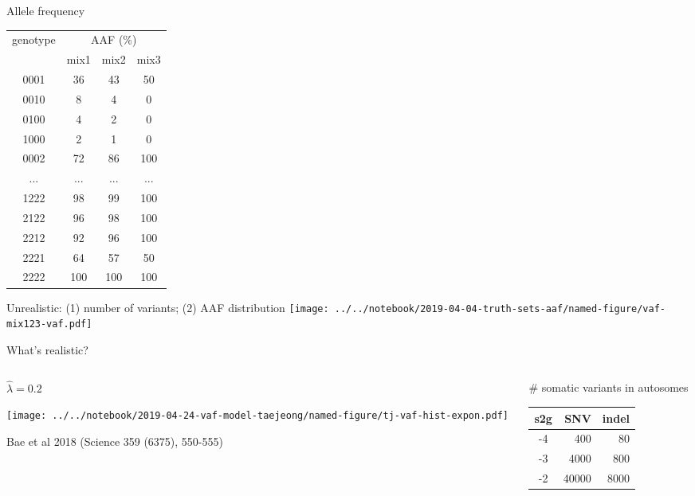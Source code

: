 \documentclass{beamer}
\begin{document}
\begin{frame}{Allele frequency}

{\tiny
\begin{tabular}{c|ccc}
genotype & \multicolumn{3}{c}{AAF (\%)} \\
& mix1 &  mix2 & mix3 \\
\hline
0001 & 36 & 43 & 50\\
0010 & 8 & 4 & 0\\
0100 & 4 & 2 & 0\\
1000 & 2 & 1 & 0\\
0002 & 72 & 86 & 100\\
... & ... & ... & ...\\
1222 & 98 & 99 & 100\\
2122 & 96 & 98 & 100\\
2212 & 92 & 96 & 100\\
2221 & 64 & 57 & 50\\
2222 & 100 & 100 & 100\\
\end{tabular}
}
\end{frame}

\begin{frame}{Unrealistic: (1) number of variants; (2) AAF distribution}
\texttt{[image: ../../notebook/2019-04-04-truth-sets-aaf/named-figure/vaf-mix123-vaf.pdf]}
\end{frame}

\begin{frame}{What's realistic?}

\begin{columns}
\begin{column}{0.5\textwidth}
\begin{center}
\(\hat{\lambda} = 0.2\)
\end{center}

\texttt{[image: ../../notebook/2019-04-24-vaf-model-taejeong/named-figure/tj-vaf-hist-expon.pdf]}

\tiny Bae et al 2018 (Science 359 (6375), 550-555)
\end{column}

\begin{column}{0.5\textwidth}
\# somatic variants in autosomes
\begin{center}
\begin{tabular}{c|r|r}
s2g & SNV & indel \\
\hline
-4 & 400 & 80 \\
-3 & 4000 & 800 \\
-2 & 40000 & 8000 \\
\end{tabular}
\end{center}
\end{column}
\end{columns}
\end{frame}
\end{document}
